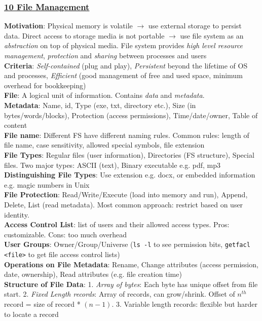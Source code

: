 \documentclass{article}
\begin{document}
{\begin{multicols*}{3}
\subsubsection*{\underline{10 File Management}}
\textbf{Motivation}: Physical memory is volatile $\to$ use external storage to persist data. Direct access to storage media is not portable $\to$ use file system as an \textit{abstraction} on top of physical media. File system provides \textit{high level resource management}, \textit{protection} and \textit{sharing} between processes and users \\
\textbf{Criteria}: \textit{Self-contained} (plug and play), \textit{Persistent} beyond the lifetime of OS and processes, \textit{Efficient} (good management of free and used space, minimum overhead for bookkeeping)\\
\textbf{File}: A logical unit of information. Contains \textit{data} and \textit{metadata}. \\
\textbf{Metadata}: Name, id, Type (exe, txt, directory etc.), Size (in bytes/words/blocks), Protection (access permissions), Time/date/owner, Table of content\\
\textbf{File name}: Different FS have different naming rules. Common rules: length of file name, case sensitivity, allowed special symbols, file extension\\
\textbf{File Types}: Regular files (user information), Directories (FS structure), Special files. Two major types: ASCII (text), Binary executable e.g. pdf, mp3\\
\textbf{Distinguishing File Types}: Use extension e.g. docx, or embedded information e.g. magic numbers in Unix\\
\textbf{File Protection}: Read/Write/Execute (load into memory and run), Append, Delete, List (read metadata). Most common approach: restrict based on user identity. \\ \textbf{Access Control List}: list of users and their allowed access types. Pros: customizable. Cons: too much overhead \\
\textbf{User Groups}: Owner/Group/Universe (\texttt{ls -l} to see permission bits, \texttt{getfacl <file>} to get file access control lists) \\
\textbf{Operations on File Metadata}: Rename, Change attributes (access permission, date, ownership), Read attributes (e.g. file creation time)\\
\textbf{Structure of File Data}: 1. \textit{Array of bytes}: Each byte has unique offset from file start. 2. \textit{Fixed Length records}: Array of records, can grow/shrink. Offset of $n^{th}$ record = size of record * $(n-1)$. 3. Variable length records: flexible but harder to locate a record\\

\end{multicols*}}
\end{document}
